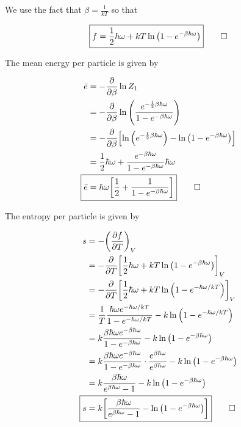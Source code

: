 \documentclass[11pt,a4paper,twocolumn]{article}
\newcommand\ddfrac[2]{\frac{\displaystyle #1}{\displaystyle #2}}
\begin{document}
\begin{enumerate}[(a)]
We use the fact that $\beta = \ddfrac{1}{kT}$ so that

\begin{equation}
	\boxed{
		f = \frac{1}{2}\hbar\omega + kT\ln\qty(1 - e^{-\beta\hbar\omega})
	} \qed \label{eq:answer-f}
\end{equation}

The mean energy per particle is given by

\begin{align}
	\bar{e} &= -\pdv{\beta}\ln{Z_1} \label{eq:mean-energy} \\
	&= -\pdv{\beta}\ln\qty(\frac{e^{-\frac{1}{2}\beta\hbar\omega}}{1 - e^{-\beta\hbar\omega}}) \nonumber \\
	&= -\pdv{\beta}\qty[\ln\qty(e^{-\frac{1}{2}\beta\hbar\omega}) - \ln\qty(1 - e^{-\beta\hbar\omega})] \nonumber \\
	&= \frac{1}{2}\hbar\omega + \frac{e^{-\beta\hbar\omega}}{1 - e^{-\beta\hbar\omega}}\hbar\omega \nonumber \\
	\Aboxed{
		\bar{e} &= \hbar\omega\qty[\frac{1}{2} + \frac{1}{1 - e^{-\beta\hbar\omega}}]
	} \qed \label{eq:answer-e}
\end{align}

The entropy per particle is given by

\begin{align}
	s &= -\qty(\pdv{f}{T})_V \label{eq:entropy} \\
	&= -\pdv{T}\qty[\frac{1}{2}\hbar\omega + kT\ln\qty(1 - e^{-\beta\hbar\omega})]_V \nonumber \\
	&= -\pdv{T}\qty[\frac{1}{2}\hbar\omega + kT\ln\qty(1 - e^{-\hbar\omega/kT})]_V \nonumber \\
	&= \frac{1}{T}\frac{\hbar\omega e^{-\hbar\omega/kT}}{1-e^{-\hbar\omega/kT}} - k\ln\qty(1 - e^{-\hbar\omega/kT}) \nonumber \\
	&= k\frac{\beta\hbar\omega e^{-\beta\hbar\omega}}{1-e^{-\beta\hbar\omega}} - k\ln\qty(1 - e^{-\beta\hbar\omega}) \nonumber \\
	&= k\frac{\beta\hbar\omega e^{-\beta\hbar\omega}}{1-e^{-\beta\hbar\omega}} \cdot \frac{e^{\beta\hbar\omega}}{e^{\beta\hbar\omega}} - k\ln\qty(1 - e^{-\beta\hbar\omega}) \nonumber \\
	&= k\frac{\beta\hbar\omega}{e^{\beta\hbar\omega} - 1} - k\ln\qty(1 - e^{-\beta\hbar\omega}) \nonumber \\
	\Aboxed{
		s &= k\qty[\frac{\beta\hbar\omega}{e^{\beta\hbar\omega} - 1} - \ln\qty(1 - e^{-\beta\hbar\omega})]
	} \qed \label{eq:answer-s}
\end{align}


\end{enumerate}
\end{document}

